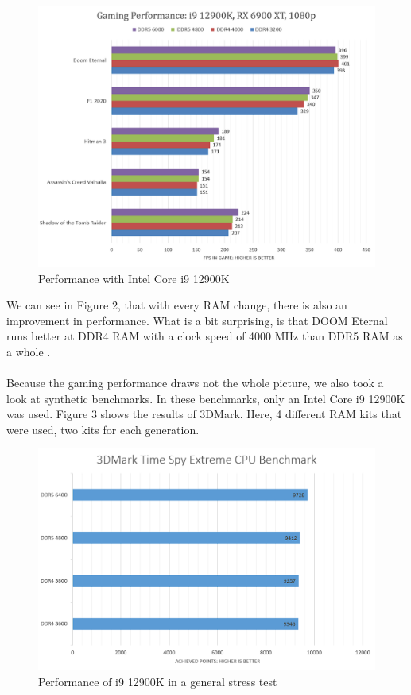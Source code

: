 \begin{figure}[H]
    \centering
    \includegraphics[width=13cm]{figures/Diagram Gaming Performance i9.png}
    \caption{Performance with Intel Core i9 12900K \parencite{12900k_gaming_and_work_benchmarks}}
\end{figure}

We can see in Figure 2, that with every RAM change, there is also an improvement in performance. What is a bit surprising, is that DOOM Eternal runs better at DDR4 RAM with a clock speed of 4000 MHz than DDR5 RAM as a whole \parencite{12900k_gaming_and_work_benchmarks}.
\\
\\
Because the gaming performance draws not the whole picture, we also took a look at synthetic benchmarks. In these benchmarks, only an Intel Core i9 12900K was used. Figure 3 shows the results of 3DMark. Here, 4 different RAM kits that were used, two kits for each generation.

\begin{figure}[H]
    \centering
    \includegraphics[width=13cm]{figures/Diagram 3DMark.png}
    \caption{Performance of i9 12900K in a general stress test \parencite{youtube_test_3dmark}}
\end{figure}

